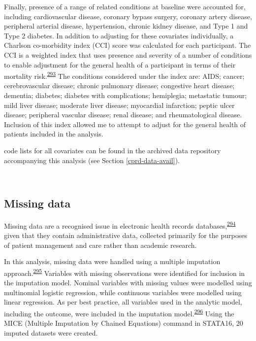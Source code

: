 \documentclass[a4paper, twoside]{templates/ociamthesis}
\begin{document}
Finally, presence of a range of related conditions at baseline were accounted for, including cardiovascular disease, coronary bypass surgery, coronary artery disease, peripheral arterial disease, hypertension, chronic kidney disease, and Type 1 and Type 2 diabetes. In addition to adjusting for these covariates individually, a Charlson co-morbidity index (CCI) score was calculated for each participant. The CCI is a weighted index that uses presence and severity of a number of conditions to enable adjustment for the general health of a participant in terms of their mortality risk.\textsuperscript{\protect\hyperlink{ref-charlson1987new}{293}} The conditions considered under the index are: AIDS; cancer; cerebrovascular disease; chronic pulmonary disease; congestive heart disease; dementia; diabetes; diabetes with complications; hemiplegia; metastatic tumour; mild liver disease; moderate liver disease; myocardial infarction; peptic ulcer disease; peripheral vascular disease; renal disease; and rheumatological disease. Inclusion of this index allowed me to attempt to adjust for the general health of patients included in the analysis.

code lists for all covariates can be found in the archived data repository accompanying this analysis (see Section \ref{cprd-data-avail}).

~

\hypertarget{missing-data}{%
\subsection{Missing data}\label{missing-data}}

Missing data are a recognised issue in electronic health records databases,\textsuperscript{\protect\hyperlink{ref-wells2013strategies}{294}} given that they contain administrative data, collected primarily for the purposes of patient management and care rather than academic research.

In this analysis, missing data were handled using a multiple imputation approach.\textsuperscript{\protect\hyperlink{ref-sterne2009}{295}} Variables with missing observations were identified for inclusion in the imputation model. Nominal variables with missing values were modelled using multinomial logistic regression, while continuous variables were modelled using linear regression. As per best practice, all variables used in the analytic model, including the outcome, were included in the imputation model.\textsuperscript{\protect\hyperlink{ref-moons2006}{296}} Using the MICE (Multiple Imputation by Chained Equations) command in STATA16, 20 imputed datasets were created.
\end{document}
